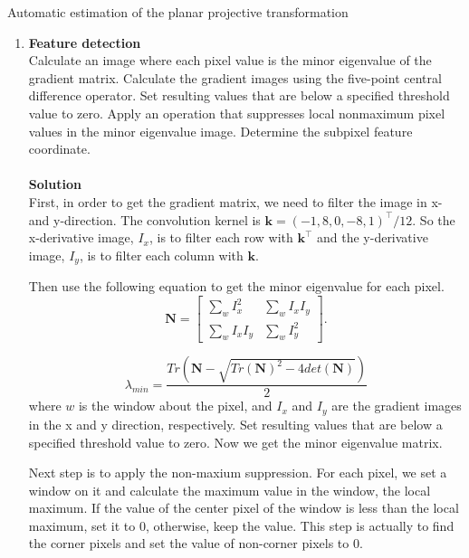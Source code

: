 \documentclass{../../assignment}
\date{\today}
\begin{document}
\begin{problemlist}

\pbitem Automatic estimation of the planar projective transformation
\begin{enumerate}
\item \textbf{Feature detection}\\
Calculate an image where each pixel value is the minor eigenvalue of the gradient matrix. Calculate the gradient images using the five-point central difference operator. Set resulting values that are below a specified threshold value to zero. Apply an operation that suppresses local nonmaximum pixel values in the minor eigenvalue image. Determine the subpixel feature coordinate.
\\\\
\textbf{Solution}\\
First, in order to get the gradient matrix, we need to filter the image in x- and y-direction. The convolution kernel is $\mathbf{k} = (-1,8,0,-8,1)^{\top}/12$. So the x-derivative image, $I_x$, is to filter each row with $\mathbf{k}^{\top}$ and the y-derivative image, $I_y$, is to filter each column with $\mathbf{k}$.

Then use the following equation to get the minor eigenvalue for each pixel.
\[
\mathbf{N} = 
\begin{bmatrix}
\sum_w I_x^2 &  \sum_w I_x I_y\\
\sum_w I_x I_y & \sum_w I_y^2
\end{bmatrix}.
\]

$$\lambda_{min} = \frac{Tr(\mathbf{N} - \sqrt{Tr(\mathbf{N})^2 - 4det(\mathbf{N})})}{2}$$
where $w$ is the window about the pixel, and $I_x$ and $I_y$ are the gradient images in the x and y direction, respectively. Set resulting values that are below a specified threshold value to zero. Now we get the minor eigenvalue matrix.

Next step is to apply the non-maxium suppression. For each pixel, we set a window on it and calculate the maximum value in the window, the local maximum. If the value of the center pixel of the window is less than the local maximum, set it to 0, otherwise, keep the value. This step is actually to find the corner pixels and set the value of non-corner pixels to 0.


\end{enumerate}
\end{problemlist}
\end{document}
